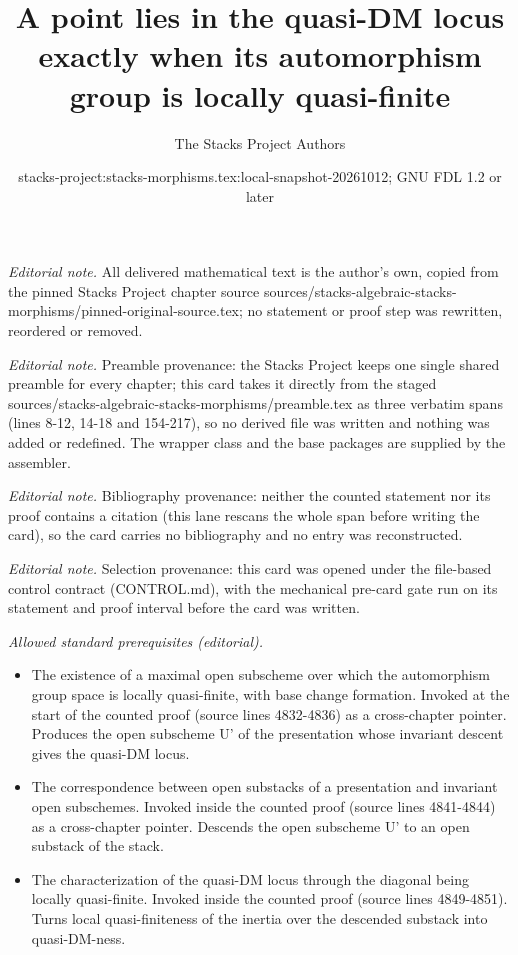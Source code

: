 \documentclass[10pt,a4paper]{amsart}
\title{A point lies in the quasi-DM locus exactly when its automorphism group is locally quasi-finite}
\author{The Stacks Project Authors}
\date{stacks-project:stacks-morphisms.tex:local-snapshot-20261012; GNU FDL 1.2 or later}
\theoremstyle{plain}
\theoremstyle{definition}
\theoremstyle{remark}
\numberwithin{equation}{subsection}
\begin{document}
\maketitle
\noindent\textit{Editorial note.} All delivered mathematical text is the author's own, copied from the pinned Stacks Project chapter source sources/stacks-algebraic-stacks-morphisms/pinned-original-source.tex; no statement or proof step was rewritten, reordered or removed.\par\medskip
\noindent\textit{Editorial note.} Preamble provenance: the Stacks Project keeps one single shared preamble for every chapter; this card takes it directly from the staged sources/stacks-algebraic-stacks-morphisms/preamble.tex as three verbatim spans (lines 8-12, 14-18 and 154-217), so no derived file was written and nothing was added or redefined. The wrapper class and the base packages are supplied by the assembler.\par\medskip
\noindent\textit{Editorial note.} Bibliography provenance: neither the counted statement nor its proof contains a citation (this lane rescans the whole span before writing the card), so the card carries no bibliography and no entry was reconstructed.\par\medskip
\noindent\textit{Editorial note.} Selection provenance: this card was opened under the file-based control contract (CONTROL.md), with the mechanical pre-card gate run on its statement and proof interval before the card was written.\par\medskip
\noindent\textit{Allowed standard prerequisites (editorial).}\begin{itemize}
\item The existence of a maximal open subscheme over which the automorphism group space is locally quasi-finite, with base change formation. Invoked at the start of the counted proof (source lines 4832-4836) as a cross-chapter pointer. Produces the open subscheme U' of the presentation whose invariant descent gives the quasi-DM locus.
\item The correspondence between open substacks of a presentation and invariant open subschemes. Invoked inside the counted proof (source lines 4841-4844) as a cross-chapter pointer. Descends the open subscheme U' to an open substack of the stack.
\item The characterization of the quasi-DM locus through the diagonal being locally quasi-finite. Invoked inside the counted proof (source lines 4849-4851). Turns local quasi-finiteness of the inertia over the descended substack into quasi-DM-ness.
\end{itemize}\medskip
\end{document}
